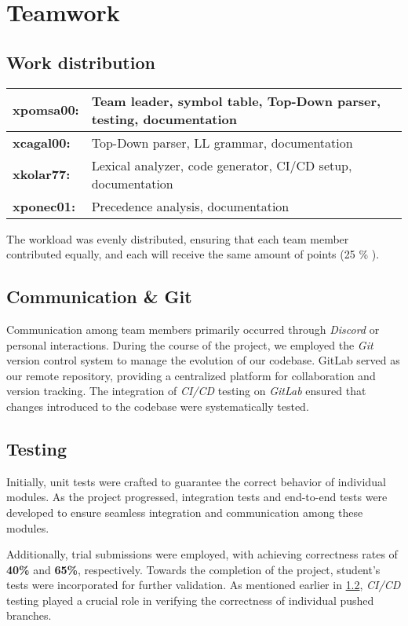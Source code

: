 \section{Teamwork}\label{Teamwork}
\subsection{Work distribution} \label{Work distribution}
\begin{center}
\begin{tabular}{|l|l |} 
    \hline 
    \textbf{xpomsa00:} & Team leader, symbol table, Top-Down parser, testing, documentation \\
    \hline
    \textbf{xcagal00:} & Top-Down parser, LL grammar, documentation\\
    \hline
    \textbf{xkolar77:} & Lexical analyzer, code generator, CI/CD setup, documentation \\
    \hline
    \textbf{xponec01:} & Precedence analysis, documentation \\
    \hline
\end{tabular}
\end{center}
The workload was evenly distributed, ensuring that each team member contributed equally, and each will receive the same amount of points (25 \% ).

\subsection{Communication \& Git}\label{Communication}
Communication among team members primarily occurred through \textit{Discord} or personal interactions.
During the course of the project, we employed the \textit{Git} version control system to manage the evolution of our codebase. GitLab served as our remote repository, providing a centralized platform for collaboration and version tracking. The integration of \textit{CI/CD} testing on \textit{GitLab} ensured that changes introduced to the codebase were systematically tested.

\subsection{Testing} \label{Testing}
Initially, unit tests were crafted to guarantee the correct behavior of individual modules. As the project progressed, integration tests and end-to-end tests were developed to ensure seamless integration and communication among these modules.

Additionally, trial submissions were employed, with achieving correctness rates of \textbf{40\%} and \textbf{65\%}, respectively. Towards the completion of the project, student's tests were incorporated for further validation. As mentioned earlier in \ref{Communication}, \textit{CI/CD} testing played a crucial role in verifying the correctness of individual pushed branches.